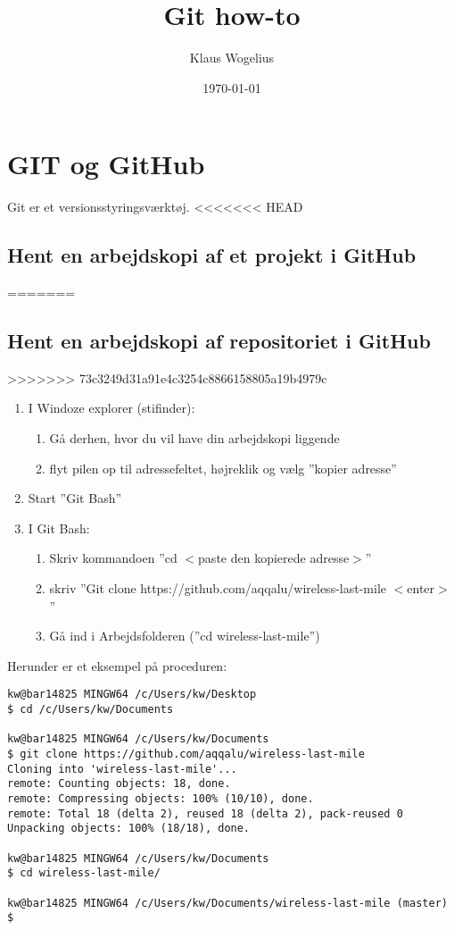 \documentclass[11pt,a4paper,twoside]{report}
\title{Git how-to}
\author{Klaus Wogelius}
\date{\today}
\begin{document}
\maketitle
\tableofcontents

\chapter{GIT og GitHub}
Git er et versionsstyringsværktøj.
<<<<<<< HEAD
\section{Hent en arbejdskopi af et projekt i GitHub} \label{clone}
=======
\section{Hent en arbejdskopi af repositoriet i GitHub}
>>>>>>> 73c3249d31a91e4c3254c8866158805a19b4979c
\begin{enumerate}

 \item I Windoze explorer (stifinder):
 \begin{enumerate}
  \item Gå derhen, hvor du vil have din arbejdskopi liggende
  \item flyt pilen op til adressefeltet, højreklik og vælg ''kopier adresse''
 \end{enumerate}
 \item Start ''Git Bash''
 \item I Git Bash:
 \begin{enumerate}
  \item Skriv kommandoen ''cd $<$paste den kopierede adresse$>$''
  \item skriv ''Git clone https://github.com/aqqalu/wireless-last-mile $<$enter$>$''
  \item Gå ind i Arbejdsfolderen (''cd wireless-last-mile'')
 \end{enumerate}
\end{enumerate}
Herunder er et eksempel på proceduren:
\begin{verbatim}
kw@bar14825 MINGW64 /c/Users/kw/Desktop
$ cd /c/Users/kw/Documents

kw@bar14825 MINGW64 /c/Users/kw/Documents
$ git clone https://github.com/aqqalu/wireless-last-mile
Cloning into 'wireless-last-mile'...
remote: Counting objects: 18, done.
remote: Compressing objects: 100% (10/10), done.
remote: Total 18 (delta 2), reused 18 (delta 2), pack-reused 0
Unpacking objects: 100% (18/18), done.

kw@bar14825 MINGW64 /c/Users/kw/Documents
$ cd wireless-last-mile/

kw@bar14825 MINGW64 /c/Users/kw/Documents/wireless-last-mile (master)
$
\end{verbatim}
\end{document}
